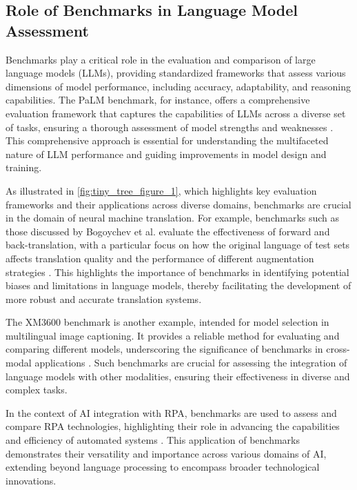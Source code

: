 \subsection{Role of Benchmarks in Language Model Assessment} \label{subsec:Role of Benchmarks in Language Model Assessment}



Benchmarks play a critical role in the evaluation and comparison of large language models (LLMs), providing standardized frameworks that assess various dimensions of model performance, including accuracy, adaptability, and reasoning capabilities. The PaLM benchmark, for instance, offers a comprehensive evaluation framework that captures the capabilities of LLMs across a diverse set of tasks, ensuring a thorough assessment of model strengths and weaknesses \cite{chowdhery2023palm}. This comprehensive approach is essential for understanding the multifaceted nature of LLM performance and guiding improvements in model design and training.

As illustrated in \autoref{fig:tiny_tree_figure_1}, which highlights key evaluation frameworks and their applications across diverse domains, benchmarks are crucial in the domain of neural machine translation. For example, benchmarks such as those discussed by Bogoychev et al. evaluate the effectiveness of forward and back-translation, with a particular focus on how the original language of test sets affects translation quality and the performance of different augmentation strategies \cite{bogoychev2020domaintranslationesenoisesynthetic}. This highlights the importance of benchmarks in identifying potential biases and limitations in language models, thereby facilitating the development of more robust and accurate translation systems.

The XM3600 benchmark is another example, intended for model selection in multilingual image captioning. It provides a reliable method for evaluating and comparing different models, underscoring the significance of benchmarks in cross-modal applications \cite{thapliyal2022crossmodal3600massivelymultilingualmultimodal}. Such benchmarks are crucial for assessing the integration of language models with other modalities, ensuring their effectiveness in diverse and complex tasks.

In the context of AI integration with RPA, benchmarks are used to assess and compare RPA technologies, highlighting their role in advancing the capabilities and efficiency of automated systems \cite{pandy2024advancementsroboticsprocessautomation}. This application of benchmarks demonstrates their versatility and importance across various domains of AI, extending beyond language processing to encompass broader technological innovations.

